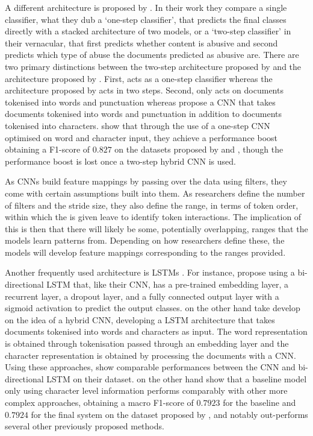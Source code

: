 A different architecture is proposed by \citet{Park:2017}.
In their work they compare a single classifier, what they dub a `one-step classifier', that predicts the final classes directly with a stacked architecture of two models, or a `two-step classifier' in their vernacular, that first predicts whether content is abusive and second predicts which type of abuse the documents predicted as abusive are.
There are two primary distinctions between the two-step architecture proposed by \citet{Park:2017} and the architecture proposed by \citet{Kolhatkar:2020}.
First, \citet{Kolhatkar:2020} acts as a one-step classifier whereas the architecture proposed by \citet{Park:2017} acts in two steps.
Second, \citet{Kolhatkar:2020} only acts on documents tokenised into words and punctuation whereas \citet{Park:2017} propose a CNN that takes documents tokenised into words and punctuation in addition to documents tokenised into characters.
\citet{Park:2017} show that through the use of a one-step CNN optimised on word and character input, they achieve a performance boost obtaining a F1-score of $0.827$ on the datasets proposed by \citet{Waseem-Hovy:2016} and \citet{Waseem:2016}, though the performance boost is lost once a two-step hybrid CNN is used.

As CNNs build feature mappings by passing over the data using filters, they come with certain assumptions built into them. 
As researchers define the number of filters and the stride size, they also define the range, in terms of token order, within which the is given leave to identify token interactions.
The implication of this is then that there will likely be some, potentially overlapping, ranges that the models learn patterns from.
Depending on how researchers define these, the models will develop feature mappings corresponding to the ranges provided.

Another frequently used architecture is LSTMs \citep{Badjatiya:2017,Kolhatkar:2020,Meyer:2019}.
For instance, \citet{Kolhatkar:2020} propose using a bi-directional LSTM that, like their CNN, has a pre-trained embedding layer, a recurrent layer, a dropout layer, and a fully connected output layer with a sigmoid activation to predict the output classes.
\citet{Meyer:2019} on the other hand take develop on the idea of a hybrid CNN, developing a LSTM architecture that takes documents tokenised into words and characters as input.
The word representation is obtained through tokenisation passed through an embedding layer and the character representation is obtained by processing the documents with a CNN.
Using these approaches, \citet{Kolhatkar:2020} show comparable performances between the CNN and bi-directional LSTM on their dataset.
\citet{Meyer:2019} on the other hand show that a baseline model only using character level information performs comparably with other more complex approaches, obtaining a macro F1-score of $0.7923$ for the baseline and $0.7924$ for the final system on the dataset proposed by \citet{Waseem-Hovy:2016}, and notably out-performs several other previously proposed methods.

